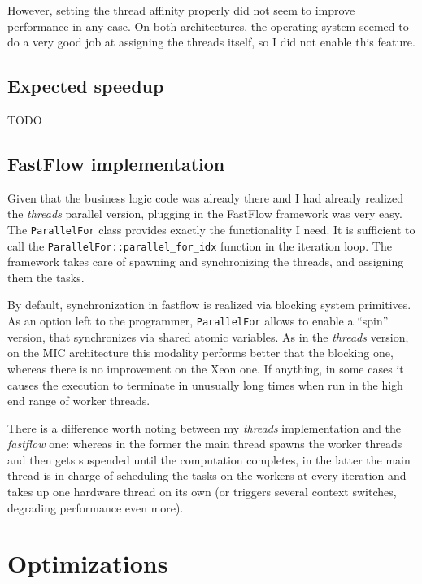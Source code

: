 \documentclass[a4paper,11pt]{article}
\newcommand{\code}[1]{\texttt{#1}}
\def\+{\discretionary{}{}{}}
\begin{document}
However, setting the thread affinity properly did not seem to improve performance in any case. On both architectures, the operating system seemed to do a very good job at assigning the threads itself, so I did not enable this feature.

\subsection{Expected speedup}

TODO

\subsection{FastFlow implementation}

Given that the business logic code was already there and I had already realized the \emph{threads} parallel version, plugging in the FastFlow framework was very easy. The \code{ParallelFor} class provides exactly the functionality I need. It is sufficient to call the \code{ParallelFor::\+parallel\_for\_idx} function in the iteration loop. The framework takes care of spawning and synchronizing the threads, and assigning them the tasks.

By default, synchronization in fastflow is realized via blocking system primitives. As an option left to the programmer, \code{ParallelFor} allows to enable a ``spin'' version, that synchronizes via shared atomic variables. As in the \emph{threads} version, on the MIC architecture this modality performs better that the blocking one, whereas there is no improvement on the Xeon one. If anything, in some cases it causes the execution to terminate in unusually long times when run in the high end range of worker threads.

There is a difference worth noting between my \emph{threads} implementation and the \emph{fastflow} one: whereas in the former the main thread spawns the worker threads and then gets suspended until the computation completes, in the latter the main thread is in charge of scheduling the tasks on the workers at every iteration and takes up one hardware thread on its own (or triggers several context switches, degrading performance even more).

\section{Optimizations}
\end{document}
